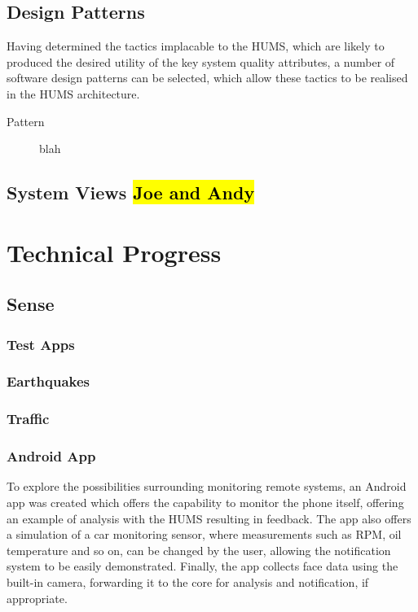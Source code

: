 \documentclass[10pt,a4paper]{article}
\begin{document}
\subsection{Design Patterns}
Having determined the tactics implacable to the HUMS, which are likely to produced the desired utility of the key system quality attributes, a number of software design patterns can be selected, which allow these tactics to be realised in the HUMS architecture.

\begin{description}
\item[Pattern] blah
\end{description}

\subsection{System Views \hl{Joe and Andy}} 
\label{sec:views}
\section{Technical Progress}
\label{sec:techprog}

\subsection{Sense}
\label{sec:sense}

\subsubsection{Test Apps}

\subsubsection{Earthquakes}

\subsubsection{Traffic}

\subsubsection{Android App}
To explore the possibilities surrounding monitoring remote systems, an Android app was created which offers the capability to monitor the phone itself, offering an example of analysis with the HUMS resulting in feedback. The app also offers a simulation of a car monitoring sensor, where measurements such as RPM, oil temperature and so on, can be changed by the user, allowing the notification system to be easily demonstrated. Finally, the app collects face data using the built-in camera, forwarding it to the core for analysis and notification, if appropriate.
\end{document}
